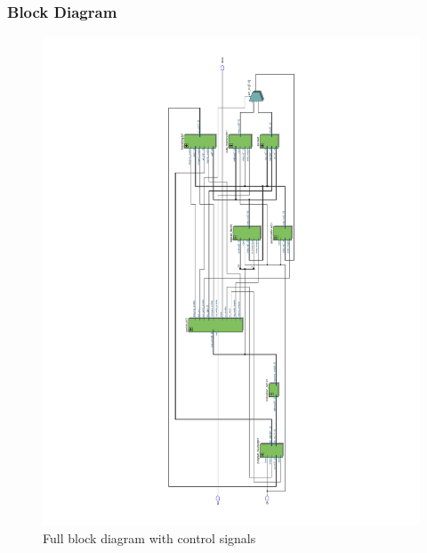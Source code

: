 	\begin{frame}
		\frametitle{Block Diagram}
		\begin{figure}[h]
			\includegraphics[angle=270, trim={7cm 1.5cm 7cm 1.5cm}, width=\textwidth]{block-diagram}
			\caption{Full block diagram with control signals}
		\end{figure}
	\end{frame}

